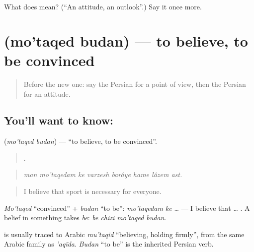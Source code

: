 \begin{tcolorbox}[breakable,colback=teal!4,colframe=teal!35!black,title={Before you move on}]
What does  mean? (\textquotedblleft{}An attitude, an outlook\textquotedblright{}.) Say it once more.
\end{tcolorbox}
\section[\texorpdfstring{\fa{معتقد} \fa{بودن} (mo'taqed budan)}{معتقد بودن (mo'taqed budan)}]{  (mo'taqed budan) — to believe, to be convinced}

\label{lesson:FA-C360-motaqed-budan}



\begin{quote}
Before the new one: say the Persian for a point of view, then the Persian for an attitude.
\end{quote}

\subsection*{You'll want to know:  }
\textbf{ } (\emph{mo'taqed budan}) — \textquotedblleft{}to believe, to be convinced\textquotedblright{}.

\begin{quote}
       .
\end{quote}

\begin{quote}
\emph{man mo'taqedam ke varzesh barâye hame lâzem ast.}
\end{quote}

\begin{quote}
I believe that sport is necessary for everyone.
\end{quote}

\emph{Mo'taqed} \textquotedblleft{}convinced\textquotedblright{} + \emph{budan} \textquotedblleft{}to be\textquotedblright{}: \emph{mo'taqedam ke} … — I believe that … . A belief in something takes \emph{be}: \emph{be chizi mo'taqed budan}.

\begin{cousinweb}
\textbf{} is usually traced to Arabic \emph{mu'taqid} \textquotedblleft{}believing, holding firmly\textquotedblright{}, from the same Arabic family as \emph{'aqīda}. \emph{Budan} \textquotedblleft{}to be\textquotedblright{} is the inherited Persian verb.
\end{cousinweb}

